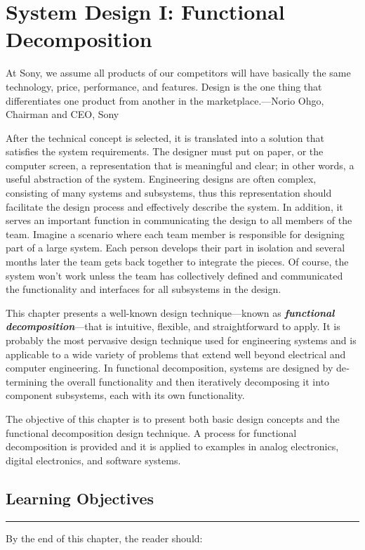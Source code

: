 \chapter{System Design I: Functional Decomposition}
\label{chapter:funcDecomp}
\graphicspath{ {./chapter05/Fig} }

\begin{itquote}
At Sony, we assume all products of our competitors will have basically
the same technology, price, performance, and features. Design is the one
thing that differentiates one product from another in the
marketplace.---Norio Ohgo, Chairman and CEO, Sony
\end{itquote}

After the technical concept is selected, it is translated into a
solution that satisfies the system require­ments. The designer must put
on paper, or the computer screen, a representation that is meaning­ful
and clear; in other words, a useful abstraction of the system.
Engineering designs are often com­plex, consisting of many systems and
subsystems, thus this representation should facilitate the design
process and effectively describe the system. In addition, it serves an
im­portant function in communicat­ing the design to all members of the
team. Imag­ine a scenario where each team member is responsible for
designing part of a large system. Each person de­velops their part in
isolation and several months later the team gets back together to
integrate the pieces. Of course, the system won't work unless the team
has collectively defined and communicated the functionality and
interfaces for all subsystems in the design.

This chapter presents a well-known design technique---known as
\emph{\textbf{functional decomposi­tion}}---that is intuitive, flexible,
and straightforward to apply. It is probably the most pervasive design
technique used for engineering systems and is applicable to a wide
variety of prob­lems that extend well be­yond electrical and computer
engineering. In functional decomposition, systems are designed by
de­termining the overall functionality and then iteratively decomposing
it into component subsys­tems, each with its own functionality.

The objective of this chapter is to present both basic design concepts
and the functional decomposition design technique. A process for
functional decomposition is provided and it is applied to examples in
analog electronics, digital electronics, and software systems.

\section*{Learning Objectives}
\noindent\rule{\linewidth}{1pt}
By the end of this chapter, the reader should:

